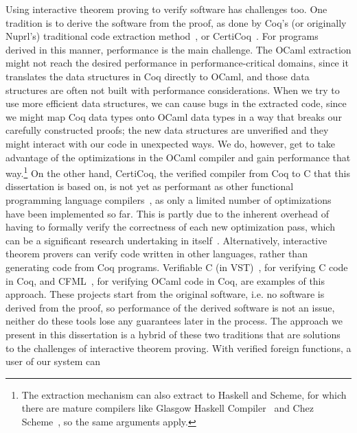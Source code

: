 Using interactive theorem proving to verify software has challenges too. One tradition is to derive the software from the proof, as done by Coq's (or originally Nuprl's) traditional code extraction method~\cite{letouzey2008extraction, constable1986nuprl}, or CertiCoq~\cite{certicoq}. For programs derived in this manner, performance is the main challenge. 
The OCaml extraction might not reach the desired performance in performance-critical domains, since it translates the data structures in Coq directly to OCaml, and those data structures are often not built with performance considerations.
When we try to use more efficient data structures, we can cause bugs in the extracted code, since we might map Coq data types onto OCaml data types in a way that breaks our carefully constructed proofs; the new data structures are unverified and they might interact with our code in unexpected ways. 
We do, however, get to take advantage of the optimizations in the OCaml compiler and gain performance that way.\footnote{The extraction mechanism can also extract to Haskell and Scheme, for which there are mature compilers like Glasgow Haskell Compiler~\cite{marlow2004glasgow} and Chez Scheme~\cite{dybvig2006chez}, so the same arguments apply.} On the other hand, CertiCoq, the verified compiler from Coq to C that this dissertation is based on, is not yet as performant as other functional programming language compilers~\cite{paraskevopoulou2020verified}, as only a limited number of optimizations have been implemented so far. This is partly due to the inherent overhead of having to formally verify the correctness of each new optimization pass, which can be a significant research undertaking in itself~\cite{vassilev2019, paraskevopoulou2020verified, paraskevopoulou2021compositional}.
Alternatively, interactive theorem provers can verify code written in other languages, rather than generating code from Coq programs. Verifiable C (in VST)~\cite{appel2014program}, for verifying C code in Coq, and CFML~\cite{chargueraud2010, chargueraud2011}, for verifying OCaml code in Coq, are examples of this approach. These projects start from the original software, i.e. no software is derived from the proof, so performance of the derived software is not an issue, neither do these tools lose any guarantees later in the process.
The approach we present in this dissertation is a hybrid of these two traditions that are solutions to the challenges of interactive theorem proving. With verified foreign functions, a user of our system can 
